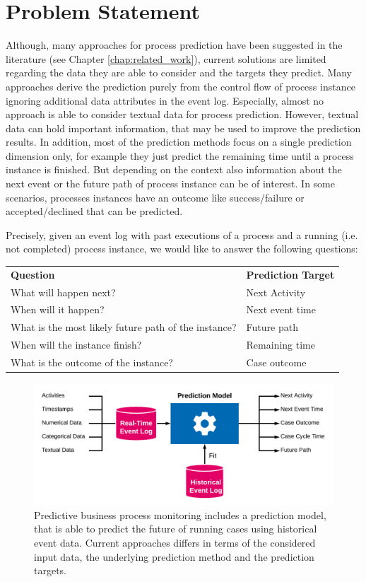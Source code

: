 \section{Problem Statement}

Although, many approaches for process prediction have been suggested in the literature (see Chapter \ref{chap:related_work}), current solutions are limited regarding the data they are able to consider and the targets they predict.
Many approaches derive the prediction purely from the control flow of process instance ignoring additional data attributes in the event log.
Especially, almost no approach is able to consider textual data for process prediction.
However, textual data can hold important information, that may be used to improve the prediction results.
In addition, most of the prediction methods focus on a single prediction dimension only, for example they just predict the remaining time until a process instance is finished.
But depending on the context also information about the next event or the future path of process instance can be of interest.
In some scenarios, processes instances have an outcome like success/failure or accepted/declined that can be predicted.

Precisely, given an event log with past executions of a process and a running (i.e. not completed) process instance, we would like to answer the following questions:

\begin{tabular}{ll}
	\textbf{Question} & \textbf{Prediction Target} \\
	What will happen next? & Next Activity\\
	When will it happen? & Next event time\\
	What is the most likely future path of the instance? & Future path\\
	When will the instance finish? & Remaining time\\
	What is the outcome of the instance? & Case outcome
\end{tabular}

\begin{figure}[htbp!]
	\centering
	\includegraphics[width=\textwidth]{figures/problem-description}
	\caption[General process prediction model]{Predictive business process monitoring includes a prediction model, that is able to predict the future of running cases using historical event data. Current approaches differs in terms of the considered input data, the underlying prediction method and the prediction targets.}
	\label{fig:/problem-description}
\end{figure}

